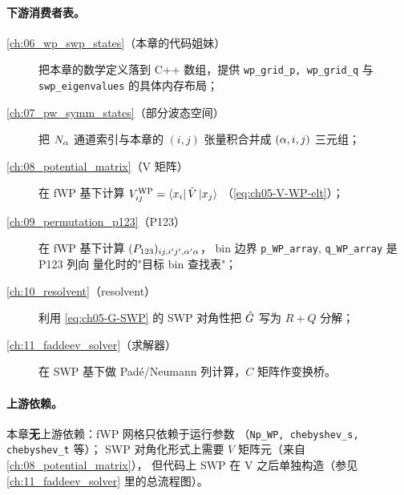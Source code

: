 \paragraph{下游消费者表。}
\begin{description}
  \item[\cref{ch:06_wp_swp_states}（本章的代码姐妹）]
        把本章的数学定义落到 C++ 数组，提供
        \texttt{wp\_grid\_p, wp\_grid\_q} 与 \texttt{swp\_eigenvalues}
        的具体内存布局；
  \item[\cref{ch:07_pw_symm_states}（部分波态空间）]
        把 \(N_\alpha\) 通道索引与本章的 \((i, j)\) 张量积合并成
        \((\alpha, i, j)\) 三元组；
  \item[\cref{ch:08_potential_matrix}（V 矩阵）]
        在 fWP 基下计算
        \(V_{ij}^{\rm WP} = \bra{x_i}\hat{V}\ket{x_{j}}\)
        （\cref{eq:ch05-V-WP-elt}）；
  \item[\cref{ch:09_permutation_p123}（P123）]
        在 fWP 基下计算 \((P_{123})_{ij,i'j',\alpha'\alpha}\)，
        bin 边界 \texttt{p\_WP\_array}, \texttt{q\_WP\_array} 是 P123 列向
        量化时的"目标 bin 查找表"；
  \item[\cref{ch:10_resolvent}（resolvent）]
        利用 \cref{eq:ch05-G-SWP} 的 SWP 对角性把 \(\hat{G}\) 写为
        \(R + Q\) 分解；
  \item[\cref{ch:11_faddeev_solver}（求解器）]
        在 SWP 基下做 Padé/Neumann 列计算，\(C\) 矩阵作变换桥。
\end{description}

\paragraph{上游依赖。}
本章\textbf{无}上游依赖：fWP 网格只依赖于运行参数
（\texttt{Np\_WP, chebyshev\_s, chebyshev\_t} 等）；
SWP 对角化形式上需要 \(V\) 矩阵元（来自 \cref{ch:08_potential_matrix}），
但代码上 SWP 在 V 之后单独构造（参见 \cref{ch:11_faddeev_solver}
里的总流程图）。

